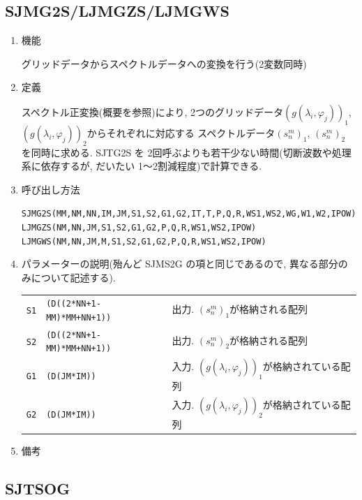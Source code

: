 \documentclass[a4j]{jarticle}
\begin{document}

\subsection{SJMG2S/LJMGZS/LJMGWS}

\begin{enumerate}

\item 機能 

グリッドデータからスペクトルデータへの変換を行う(2変数同時)

\item 定義

スペクトル正変換(概要を参照)により, 2つのグリッドデータ$(g(\lambda_i,\varphi_j))_1$,
$(g(\lambda_i,\varphi_j))_2$からそれぞれに対応する
スペクトルデータ$(s^m_n)_1$, $(s^m_n)_2$ を同時に求める. SJTG2S を
2回呼ぶよりも若干少ない時間(切断波数や処理系に依存するが,
だいたい 1〜2割減程度)で計算できる.

\item 呼び出し方法

{\tt SJMG2S(MM,NM,NN,IM,JM,S1,S2,G1,G2,IT,T,P,Q,R,WS1,WS2,WG,W1,W2,IPOW)}\\
{\tt LJMGZS(NM,NN,JM,S1,S2,G1,G2,P,Q,R,WS1,WS2,IPOW)}\\
{\tt LJMGWS(NM,NN,JM,M,S1,S2,G1,G2,P,Q,R,WS1,WS2,IPOW)}
  
\item パラメーターの説明(殆んど SJMS2G の項と同じであるので,
異なる部分のみについて記述する).

\begin{tabular}{lll}
{\tt S1} & {\tt (D((2*NN+1-MM)*MM+NN+1))} & 出力. $(s^m_n)_1$が格納される配列\\
{\tt S2} & {\tt (D((2*NN+1-MM)*MM+NN+1))} & 出力. $(s^m_n)_2$が格納される配列\\
{\tt G1} & {\tt (D(JM*IM))} & 入力. $(g(\lambda_i,\varphi_j))_1$が格納されている配列\\
{\tt G2} & {\tt (D(JM*IM))} & 入力. $(g(\lambda_i,\varphi_j))_2$が格納されている配列
\end{tabular}

\item 備考

\end{enumerate}


\subsection{SJTSOG}
\end{document}
